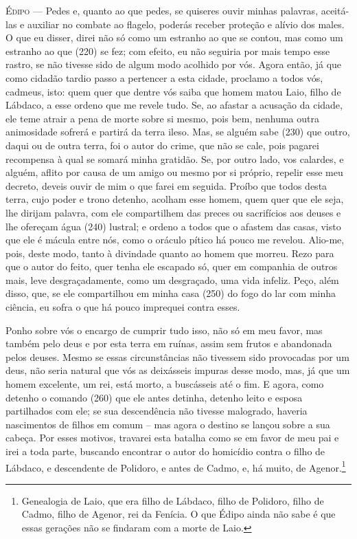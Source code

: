 \textsc{Édipo} --- Pedes e, quanto ao que pedes, se quiseres ouvir minhas palavras,
aceitá-las e auxiliar no combate ao flagelo, poderás receber proteção e
alívio dos males. O que eu disser, direi não só como um estranho ao que
se contou, mas como um estranho ao que (220) se fez; com efeito, eu não
seguiria por mais tempo esse rastro, se não tivesse sido de algum modo
acolhido por vós. Agora então, já que como cidadão tardio passo a
pertencer a esta cidade, proclamo a todos vós, cadmeus, isto: quem quer
que dentre vós saiba que homem matou Laio, filho de Lábdaco, a esse
ordeno que me revele tudo. Se, ao afastar a acusação da cidade, ele teme
atrair a pena de morte sobre si mesmo, pois bem, nenhuma outra
animosidade sofrerá e partirá da terra ileso. Mas, se alguém sabe (230)
que outro, daqui ou de outra terra, foi o autor do crime, que não se
cale, pois pagarei recompensa à qual se somará minha gratidão. Se, por
outro lado, vos calardes, e alguém, aflito por causa de um amigo ou
mesmo por si próprio, repelir esse meu decreto, deveis ouvir de mim o
que farei em seguida. Proíbo que todos desta terra, cujo poder e trono
detenho, acolham esse homem, quem quer que ele seja, lhe dirijam
palavra, com ele compartilhem das preces ou sacrifícios aos deuses e lhe
ofereçam água (240) lustral; e ordeno a todos que o afastem das casas,
visto que ele é mácula entre nós, como o oráculo pítico há pouco me
revelou. Alio-me, pois, deste modo, tanto à divindade quanto ao homem
que morreu. Rezo para que o autor do feito, quer tenha ele escapado só,
quer em companhia de outros mais, leve desgraçadamente, como um
desgraçado, uma vida infeliz. Peço, além disso, que, se ele compartilhou
em minha casa (250) do fogo do lar com minha ciência, eu sofra o que há
pouco imprequei contra esses.

Ponho sobre vós o encargo de cumprir tudo isso, não só em meu favor, mas
também pelo deus e por esta terra em ruínas, assim sem frutos e
abandonada pelos deuses. Mesmo se essas circunstâncias não tivessem sido
provocadas por um deus, não seria natural que vós as deixásseis impuras
desse modo, mas, já que um homem excelente, um rei, está morto, a
buscásseis até o fim. E agora, como detenho o comando (260) que ele
antes detinha, detenho leito e esposa partilhados com ele; se sua
descendência não tivesse malogrado, haveria nascimentos de filhos em
comum -- mas agora o destino se lançou sobre a sua cabeça. Por esses
motivos, travarei esta batalha como se em favor de meu pai e irei a toda
parte, buscando encontrar o autor do homicídio contra o filho de
Lábdaco, e descendente de Polidoro, e antes de Cadmo, e, há muito, de
Agenor.\footnote{Genealogia de Laio, que era filho de Lábdaco, filho de
  Polidoro, filho de Cadmo, filho de Agenor, rei da Fenícia. O que Édipo
  ainda não sabe é que essas gerações não se findaram com a morte de
  Laio.}

